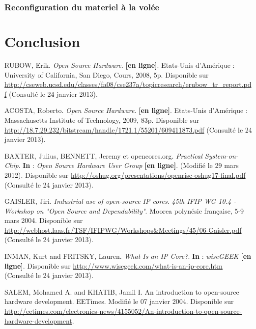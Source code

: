 \documentclass{report}
\begin{document}
\subsection{Reconfiguration du materiel à la volée}

\newpage

\chapter*{Conclusion}




\begin{thebibliography}{1}
  
RUBOW, Erik. \textit{Open Source Hardware}. \textbf{[en ligne]}. Etats-Unis d'Amérique : University of California, San Diego, Cours, 2008, 5p. Disponible sur \url{http://cseweb.ucsd.edu/classes/fa08/cse237a/topicresearch/erubow\_tr\_report.pdf} (Consulté le 24 janvier 2013).

ACOSTA, Roberto. \textit{Open Source Hardware}. \textbf{[en ligne]}. Etats-Unis d'Amérique : Massachusetts Institute of Technology, 2009, 83p. Disponible sur \url{http://18.7.29.232/bitstream/handle/1721.1/55201/609411873.pdf} (Consulté le 24 janvier 2013).

BAXTER, Julius, BENNETT, Jeremy et opencores.org. \textit{Practical System-on-Chip}. \textbf{In} : \textit{Open Source Hardware User Group} \textbf{[en ligne]}. (Modifié le 29 mars 2012). Disponible sur \url{http://oshug.org/presentations/openrisc-oshug17-final.pdf} (Consulté le 24 janvier 2013).

GAISLER, Jiri. \textit{Industrial use of open-source IP cores}. \textit{45th IFIP WG 10.4 - Workshop on "Open Source and Dependability"}. Moorea polynésie française, 5-9 mars 2004. Disponible sur \url{http://webhost.laas.fr/TSF/IFIPWG/Workshops\&Meetings/45/06-Gaisler.pdf} (Consulté le 24 janvier 2013).

INMAN, Kurt and FRITSKY, Lauren. \textit{What Is an IP Core?}. \textbf{In} : \textit{wiseGEEK} \textbf{[en ligne]}. Disponible sur \url{http://www.wisegeek.com/what-is-an-ip-core.htm} (Consulté le 24 janvier 2013).

SALEM, Mohamed A. and KHATIB, Jamil I. An introduction to open-source hardware development. EETimes. Modifié le 07 janvier 2004. Disponible sur \url{http://eetimes.com/electronics-news/4155052/An-introduction-to-open-source-hardware-development}.


\end{thebibliography}
\end{document}
